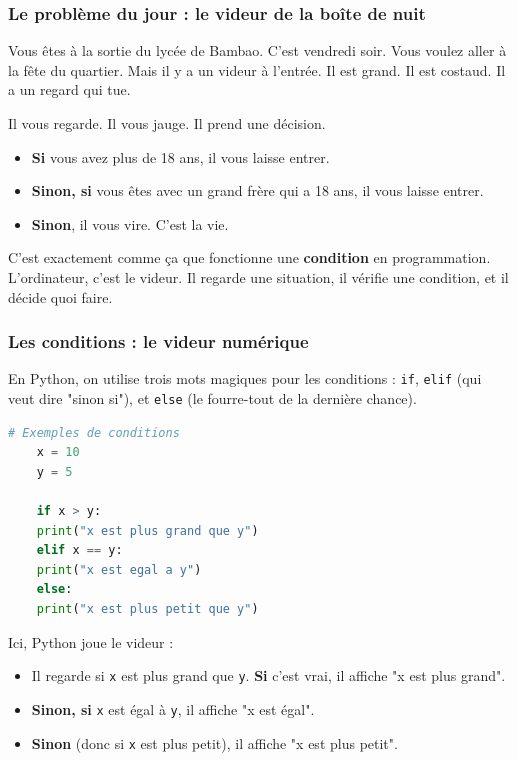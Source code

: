 \documentclass[12pt,a4paper]{article}
\begin{document}
\subsubsection{Le problème du jour : le videur de la boîte de nuit}

Vous êtes à la sortie du lycée de Bambao. C'est vendredi soir. Vous voulez aller à la fête du quartier. Mais il y a un videur à l'entrée. Il est grand. Il est costaud. Il a un regard qui tue.

Il vous regarde. Il vous jauge. Il prend une décision.

\begin{itemize}
	\item \textbf{Si} vous avez plus de 18 ans, il vous laisse entrer.
	\item \textbf{Sinon, si} vous êtes avec un grand frère qui a 18 ans, il vous laisse entrer.
	\item \textbf{Sinon}, il vous vire. C'est la vie.
\end{itemize}

C'est exactement comme ça que fonctionne une \textbf{condition} en programmation. L'ordinateur, c'est le videur. Il regarde une situation, il vérifie une condition, et il décide quoi faire.

\subsubsection{Les conditions : le videur numérique}

En Python, on utilise trois mots magiques pour les conditions : \texttt{if}, \texttt{elif} (qui veut dire "sinon si"), et \texttt{else} (le fourre-tout de la dernière chance).

\begin{lstlisting}[language=Python]
	# Exemples de conditions
	x = 10
	y = 5
	
	if x > y:
	print("x est plus grand que y")
	elif x == y:
	print("x est egal a y")
	else:
	print("x est plus petit que y")
\end{lstlisting}

Ici, Python joue le videur :

\begin{itemize}
	\item Il regarde si \texttt{x} est plus grand que \texttt{y}. \textbf{Si} c'est vrai, il affiche "x est plus grand".
	\item \textbf{Sinon, si} \texttt{x} est égal à \texttt{y}, il affiche "x est égal".
	\item \textbf{Sinon} (donc si \texttt{x} est plus petit), il affiche "x est plus petit".
\end{itemize}
\end{document}
